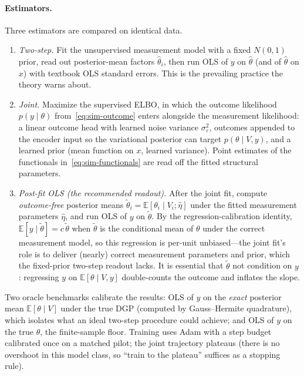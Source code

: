\paragraph{Estimators.}
Three estimators are compared on identical data.
\begin{enumerate}
\item \emph{Two-step.}  Fit the unsupervised measurement model with a fixed
  $N(0,1)$ prior, read out posterior-mean factors $\hat\theta_i$, then run
  OLS of $y$ on $\hat\theta$ (and of $\hat\theta$ on $x$) with textbook OLS
  standard errors.  This is the prevailing practice the theory warns about.
\item \emph{Joint.}  Maximize the supervised ELBO, in which the outcome
  likelihood $p(y\mid\theta)$ from~\eqref{eq:sim-outcome} enters alongside
  the measurement likelihood: a linear outcome head with learned noise
  variance $\sigma_\varepsilon^2$, outcomes appended to the encoder input so
  the variational posterior can target $p(\theta\mid V,y)$, and a learned
  prior (mean function on $x$, learned variance).  Point estimates of the
  functionals in~\eqref{eq:sim-functionals} are read off the fitted
  structural parameters.
\item \emph{Post-fit OLS (the recommended readout).}  After the joint fit,
  compute \emph{outcome-free} posterior means
  $\tilde\theta_i=\mathbb{E}[\theta_i\mid V_i;\hat\eta]$ under the fitted
  measurement parameters $\hat\eta$, and run OLS of $y$ on $\tilde\theta$.
  By the regression-calibration identity,
  $\mathbb{E}[y\mid\tilde\theta]=c\,\tilde\theta$ when $\tilde\theta$ is the
  conditional mean of $\theta$ under the correct measurement model, so this
  regression is per-unit unbiased---the joint fit's role is to deliver
  (nearly) correct measurement parameters and prior, which the fixed-prior
  two-step readout lacks.  It is essential that $\tilde\theta$ not condition
  on $y$: regressing $y$ on $\mathbb{E}[\theta\mid V,y]$ double-counts the
  outcome and inflates the slope.
\end{enumerate}
Two oracle benchmarks calibrate the results: OLS of $y$ on the \emph{exact}
posterior mean $\mathbb{E}[\theta\mid V]$ under the true DGP (computed by
Gauss--Hermite quadrature), which isolates what an ideal two-step procedure
could achieve; and OLS of $y$ on the true $\theta$, the finite-sample
floor.  Training uses Adam with a step budget calibrated once on a matched
pilot; the joint trajectory plateaus (there is no overshoot in this model
class, so ``train to the plateau'' suffices as a stopping rule).

